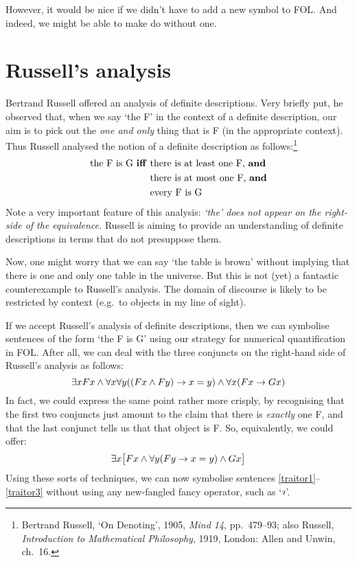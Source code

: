 However, it would be nice if we didn't have to add a new symbol to FOL. And indeed, we might be able to make do without one.

\section{Russell's analysis}
Bertrand Russell offered an analysis of definite descriptions. Very briefly put, he observed that, when we say `the F' in the context of a definite description, our aim is to pick out the \emph{one and only} thing that is F (in the appropriate context). Thus Russell analysed the notion of a definite description as follows:\footnote{Bertrand Russell, `On Denoting', 1905, \emph{Mind 14}, pp.\ 479--93; also Russell, \emph{Introduction to Mathematical Philosophy}, 1919, London: Allen and Unwin, ch.\ 16.}
	\begin{align*}
		\text{the F is G \textbf{iff} }&\text{there is at least one F, \emph{and}}\\
	&\text{there is at most one F, \emph{and}}\\	
	&\text{every F is G}
\end{align*}
Note a very important feature of this analysis: \emph{`the' does not appear on the right-side of the equivalence.} Russell is aiming to provide an understanding of definite descriptions in terms that do not presuppose them. 

Now, one might worry that we can say `the table is brown' without implying that there is one and only one table in the universe. But this is not (yet) a fantastic counterexample to Russell's analysis. The domain of discourse is likely to be restricted by context (e.g.\ to objects in my line of sight).

If we accept Russell's analysis of definite descriptions, then we can symbolise sentences of the form `the F is G' using our strategy for numerical quantification in FOL. After all, we can deal with the three conjuncts on the right-hand side of Russell's analysis as follows:
	$$\exists x Fx \eand \forall x \forall y ((Fx \eand Fy) \eif x = y) \eand \forall x (Fx \eif Gx)$$
In fact, we could express the same point rather more crisply, by recognising that the first two conjuncts just amount to the claim that there is \emph{exactly} one F, and that the last conjunct tells us that that object is F. So, equivalently, we could offer:
	$$\exists x \bigl[Fx \eand \forall y (Fy \eif x = y) \eand Gx\bigr]$$
Using these sorts of techniques, we can now symbolise sentences \ref{traitor1}--\ref{traitor3} without using any new-fangled fancy operator, such as `$\maththe$'. 

